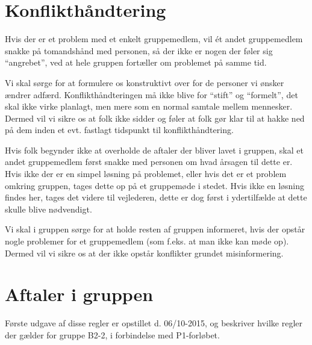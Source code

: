 \documentclass[hidelinks, 12pt]{article}
\newcommand{\group}{B2-2}
\begin{document}
	\section*{Konflikthåndtering}
	Hvis der er et problem med et enkelt gruppemedlem, vil \'et andet gruppemedlem snakke på tomandshånd med personen, så der ikke er nogen der føler sig ``angrebet'', ved at hele gruppen fortæller om problemet på samme tid. 

	Vi skal sørge for at formulere os konstruktivt over for de personer vi ønsker ændrer adfærd. Konflikthåndteringen må ikke blive for ``stift'' og ``formelt'', det skal ikke virke planlagt, men mere som en normal samtale mellem mennesker. Dermed vil vi sikre os at folk ikke sidder og føler at folk gør klar til at hakke ned på dem inden et evt. fastlagt tidspunkt til konflikthåndtering.

	Hvis folk begynder ikke at overholde de aftaler der bliver lavet i gruppen, skal et andet gruppemedlem først snakke med personen om hvad årsagen til dette er. Hvis ikke der er en simpel løsning på problemet, eller hvis det er et problem omkring gruppen, tages dette op på et gruppemøde i stedet. Hvis ikke en løsning findes her, tages det videre til vejlederen, dette er dog først i ydertilfælde at dette skulle blive nødvendigt.

	Vi skal i gruppen sørge for at holde resten af gruppen informeret, hvis der opstår nogle problemer for et gruppemedlem (som f.eks. at man ikke kan møde op). Dermed vil vi sikre os at der ikke opstår konflikter grundet misinformering.

	\section*{Aftaler i gruppen}
	Første udgave af disse regler er opstillet d. 06/10-2015, og beskriver hvilke regler der gælder for gruppe \group, i forbindelse med P1-forløbet.
\end{document}
